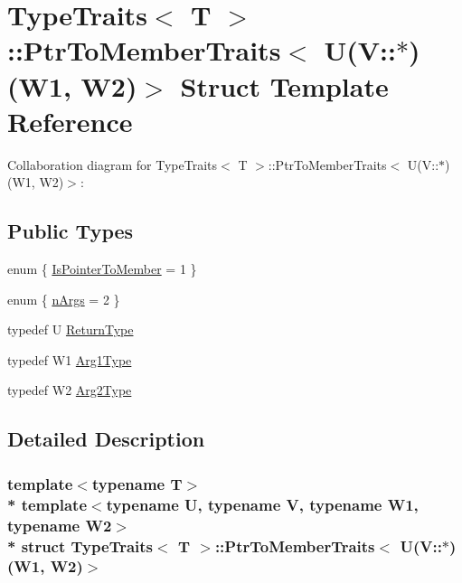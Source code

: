 \hypertarget{structTypeTraits_1_1PtrToMemberTraits_3_01U_07V_1_1_5_08_07W1_00_01W2_08_4}{}\section{Type\+Traits$<$ T $>$\+:\+:Ptr\+To\+Member\+Traits$<$ U(V\+:\+:$\ast$)(W1, W2)$>$ Struct Template Reference}
\label{structTypeTraits_1_1PtrToMemberTraits_3_01U_07V_1_1_5_08_07W1_00_01W2_08_4}


Collaboration diagram for Type\+Traits$<$ T $>$\+:\+:Ptr\+To\+Member\+Traits$<$ U(V\+:\+:$\ast$)(W1, W2)$>$\+:
\subsection*{Public Types}
\begin{DoxyCompactItemize}
\item 
enum \{ \hyperlink{structTypeTraits_1_1PtrToMemberTraits_3_01U_07V_1_1_5_08_07W1_00_01W2_08_4_aaa7045aefbea304f8ef365a035f0f007a3a0e9d0078f16918b44d01cfef20d34f}{Is\+Pointer\+To\+Member} = 1
 \}
\item 
enum \{ \hyperlink{structTypeTraits_1_1PtrToMemberTraits_3_01U_07V_1_1_5_08_07W1_00_01W2_08_4_a26b4957758c07d0e7b8660bd80799fc8aeafd6dc51924a9a590918a7a087263e4}{n\+Args} = 2
 \}
\item 
typedef U \hyperlink{structTypeTraits_1_1PtrToMemberTraits_3_01U_07V_1_1_5_08_07W1_00_01W2_08_4_a5aa75fcb1f0d8a604c1affc1a63c96c1}{Return\+Type}
\item 
typedef W1 \hyperlink{structTypeTraits_1_1PtrToMemberTraits_3_01U_07V_1_1_5_08_07W1_00_01W2_08_4_ab9ac86334caf5049af037bb614b46630}{Arg1\+Type}
\item 
typedef W2 \hyperlink{structTypeTraits_1_1PtrToMemberTraits_3_01U_07V_1_1_5_08_07W1_00_01W2_08_4_a2a852ccf8e733e1a0cd3b8b19edd2a12}{Arg2\+Type}
\end{DoxyCompactItemize}


\subsection{Detailed Description}
\subsubsection*{template$<$typename T$>$\\*
template$<$typename U, typename V, typename W1, typename W2$>$\\*
struct Type\+Traits$<$ T $>$\+::\+Ptr\+To\+Member\+Traits$<$ U(\+V\+::$\ast$)(\+W1, W2)$>$}

